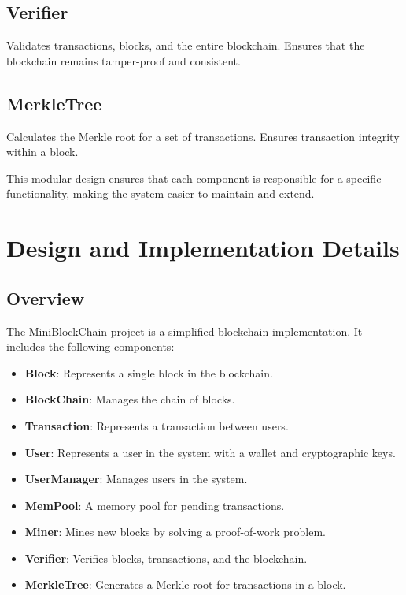 \documentclass[12pt]{article}
\begin{document}
\subsection{Verifier}
Validates transactions, blocks, and the entire blockchain. Ensures that the blockchain remains tamper-proof and consistent.

\subsection{MerkleTree}
Calculates the Merkle root for a set of transactions. Ensures transaction integrity within a block.

This modular design ensures that each component is responsible for a specific functionality, making the system easier to maintain and extend.

\section{Design and Implementation Details}

\subsection{Overview}
The MiniBlockChain project is a simplified blockchain implementation. It includes the following components:
\begin{itemize}
    \item \textbf{Block}: Represents a single block in the blockchain.
    \item \textbf{BlockChain}: Manages the chain of blocks.
    \item \textbf{Transaction}: Represents a transaction between users.
    \item \textbf{User}: Represents a user in the system with a wallet and cryptographic keys.
    \item \textbf{UserManager}: Manages users in the system.
    \item \textbf{MemPool}: A memory pool for pending transactions.
    \item \textbf{Miner}: Mines new blocks by solving a proof-of-work problem.
    \item \textbf{Verifier}: Verifies blocks, transactions, and the blockchain.
    \item \textbf{MerkleTree}: Generates a Merkle root for transactions in a block.
\end{itemize}
\end{document}
